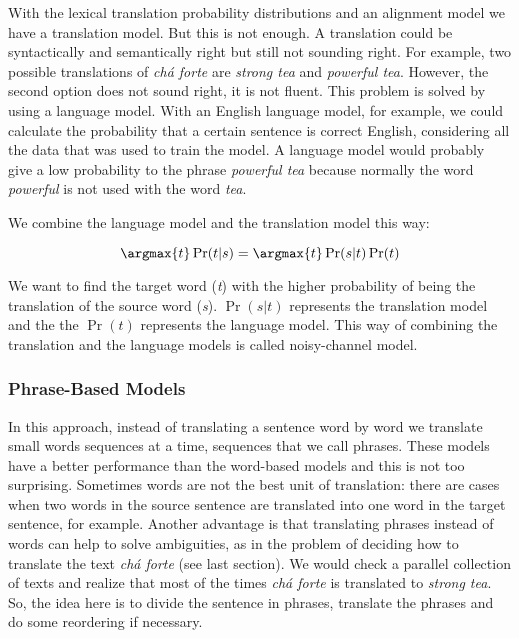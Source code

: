 With the lexical translation probability distributions and an alignment model we have a translation model. But this is not enough. A translation could be syntactically and semantically right but still not sounding right. For example, two possible translations of \textit{chá forte} are \textit{strong tea} and \textit{powerful tea}. However, the second option does not sound right, it is not fluent. This problem is solved by using a language model. With an English language model, for example, we could calculate the probability that a certain sentence is correct English, considering all the data that was used to train the model. A language model would probably give a low probability to the phrase \textit{powerful tea} because normally the word \textit{powerful} is not used with the word \textit{tea}.

We combine the language model and the translation model this way:

\begin{equation}
\argmax{t} \Pr(t|s) = \argmax{t} \Pr(s|t) \Pr(t)
\end{equation}


We want to find the target word (\textit{t}) with the higher probability of being the translation of the source word (\textit{s}). $\Pr(s|t)$ represents the translation model and the the $\Pr(t)$ represents the language model. This way of combining the translation and the language models is called noisy-channel model.

\subsubsection{Phrase-Based Models}

In this approach, instead of translating a sentence word by word we translate small words sequences at a time, sequences that we call phrases. These models have a better performance than the word-based models and this is not too surprising. Sometimes words are not the best unit of translation: there are cases when two words in the source sentence are translated into one word in the target sentence, for example. Another advantage is that translating phrases instead of words can help to solve ambiguities, as in the problem of deciding how to translate the text \textit{chá forte} (see last section). We would check a parallel collection of texts and realize that most of the times \textit{chá forte} is translated to \textit{strong tea}. So, the idea here is to divide the sentence in phrases, translate the phrases and do some reordering if necessary.

